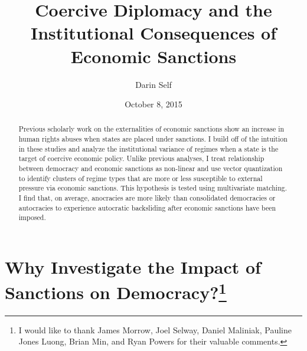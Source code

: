 \documentclass[a4paper]{article}\usepackage[]{graphicx}\usepackage[]{color}
\title{Coercive Diplomacy and the Institutional Consequences of Economic Sanctions}
\author{Darin Self}
\date{October 8, 2015}
\begin{document}
\maketitle

\begin{abstract}
Previous scholarly work on the externalities of economic sanctions show an increase in human rights abuses when states are placed under sanctions. I build off of the intuition in these studies and analyze the institutional variance of regimes when a state is the target of coercive economic policy. Unlike previous analyses, I treat relationship between democracy and economic sanctions as non-linear and use vector quantization to identify clusters of regime types that are more or less susceptible to external pressure via economic sanctions. This hypothesis is tested using multivariate matching. I find that, on average, anocracies are more likely than consolidated democracies or autocracies to experience autocratic backsliding after economic sanctions have been imposed.  
\end{abstract}

\section*{\large{Why Investigate the Impact of Sanctions on Democracy?\footnote{I would like to thank James Morrow, Joel Selway, Daniel Maliniak, Pauline Jones Luong, Brian Min, and Ryan Powers for their valuable comments.}}}
\end{document}
